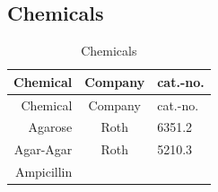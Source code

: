 \documentclass[11pt,singlespacinge,twoside]{reedthesis} %
\theoremstyle{definition}
\theoremstyle{definition}
\theoremstyle{definition}
\theoremstyle{remark}
\begin{document}
\hypertarget{mat-chem}{%
\subsection{Chemicals}\label{mat-chem}}
\begin{longtable}[]{@{}rcl@{}}
\caption{\label{tab:met-chem} Chemicals}\tabularnewline
\toprule
\begin{minipage}[b]{0.29\columnwidth}\raggedleft
Chemical\strut
\end{minipage} & \begin{minipage}[b]{0.33\columnwidth}\centering
Company\strut
\end{minipage} & \begin{minipage}[b]{0.29\columnwidth}\raggedright
cat.-no.\strut
\end{minipage}\tabularnewline
\midrule
\endfirsthead
\toprule
\begin{minipage}[b]{0.29\columnwidth}\raggedleft
Chemical\strut
\end{minipage} & \begin{minipage}[b]{0.33\columnwidth}\centering
Company\strut
\end{minipage} & \begin{minipage}[b]{0.29\columnwidth}\raggedright
cat.-no.\strut
\end{minipage}\tabularnewline
\midrule
\endhead
\begin{minipage}[t]{0.29\columnwidth}\raggedleft
Agarose\strut
\end{minipage} & \begin{minipage}[t]{0.33\columnwidth}\centering
Roth\strut
\end{minipage} & \begin{minipage}[t]{0.29\columnwidth}\raggedright
6351.2\strut
\end{minipage}\tabularnewline
\begin{minipage}[t]{0.29\columnwidth}\raggedleft
Agar-Agar\strut
\end{minipage} & \begin{minipage}[t]{0.33\columnwidth}\centering
Roth\strut
\end{minipage} & \begin{minipage}[t]{0.29\columnwidth}\raggedright
5210.3\strut
\end{minipage}\tabularnewline
\begin{minipage}[t]{0.29\columnwidth}\raggedleft
Ampicillin\strut
\end{minipage} & \begin{minipage}[t]{0.33\columnwidth}\centering

\end{minipage}
\end{longtable}
\end{document}
